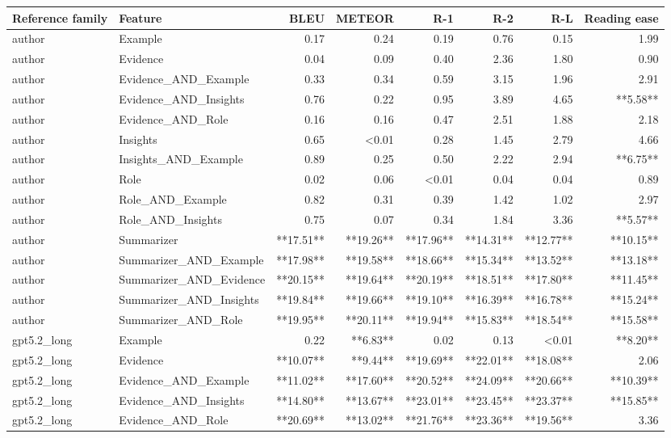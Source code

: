 \begin{tabular}{llrrrrrr}
\toprule
Reference family & Feature & BLEU & METEOR & R-1 & R-2 & R-L & Reading ease \\
\midrule
author & Example & 0.17 & 0.24 & 0.19 & 0.76 & 0.15 & 1.99 \\
author & Evidence & 0.04 & 0.09 & 0.40 & 2.36 & 1.80 & 0.90 \\
author & Evidence_AND_Example & 0.33 & 0.34 & 0.59 & 3.15 & 1.96 & 2.91 \\
author & Evidence_AND_Insights & 0.76 & 0.22 & 0.95 & 3.89 & 4.65 & **5.58** \\
author & Evidence_AND_Role & 0.16 & 0.16 & 0.47 & 2.51 & 1.88 & 2.18 \\
author & Insights & 0.65 & <0.01 & 0.28 & 1.45 & 2.79 & 4.66 \\
author & Insights_AND_Example & 0.89 & 0.25 & 0.50 & 2.22 & 2.94 & **6.75** \\
author & Role & 0.02 & 0.06 & <0.01 & 0.04 & 0.04 & 0.89 \\
author & Role_AND_Example & 0.82 & 0.31 & 0.39 & 1.42 & 1.02 & 2.97 \\
author & Role_AND_Insights & 0.75 & 0.07 & 0.34 & 1.84 & 3.36 & **5.57** \\
author & Summarizer & **17.51** & **19.26** & **17.96** & **14.31** & **12.77** & **10.15** \\
author & Summarizer_AND_Example & **17.98** & **19.58** & **18.66** & **15.34** & **13.52** & **13.18** \\
author & Summarizer_AND_Evidence & **20.15** & **19.64** & **20.19** & **18.51** & **17.80** & **11.45** \\
author & Summarizer_AND_Insights & **19.84** & **19.66** & **19.10** & **16.39** & **16.78** & **15.24** \\
author & Summarizer_AND_Role & **19.95** & **20.11** & **19.94** & **15.83** & **18.54** & **15.58** \\
gpt5.2_long & Example & 0.22 & **6.83** & 0.02 & 0.13 & <0.01 & **8.20** \\
gpt5.2_long & Evidence & **10.07** & **9.44** & **19.69** & **22.01** & **18.08** & 2.06 \\
gpt5.2_long & Evidence_AND_Example & **11.02** & **17.60** & **20.52** & **24.09** & **20.66** & **10.39** \\
gpt5.2_long & Evidence_AND_Insights & **14.80** & **13.67** & **23.01** & **23.45** & **23.37** & **15.85** \\
gpt5.2_long & Evidence_AND_Role & **20.69** & **13.02** & **21.76** & **23.36** & **19.56** & 3.36 \\

\end{tabular}
